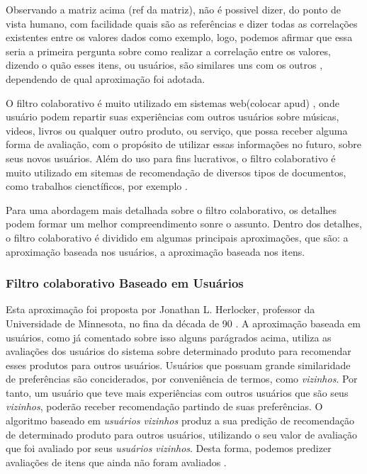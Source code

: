 \documentclass[12pt,
				openright,
				twoside,
				a4paper,
				apter=TITLE,
				section=TITLE,
				subsection=TITLE,
				chapter=TITLE,
				english,
				french,
				spanish,
				brazil]{abntex2}
\begin{document}
Observando a matriz acima (ref da matriz), não é possivel dizer, do ponto de vista humano, com facilidade quais são as referências e dizer todas as correlações existentes entre os valores dados como exemplo, logo, podemos afirmar que essa seria a primeira pergunta sobre como realizar a correlação entre os valores, dizendo o quão esses itens, ou usuários, são similares uns com os outros \cite{ricci2011introduction}, dependendo de qual aproximação foi adotada.

O filtro colaborativo é muito utilizado em sistemas web(colocar apud) \cite{turban2009electronic}, onde usuário podem repartir suas experiências com outros usuários sobre músicas, videos, livros ou qualquer outro produto, ou serviço, que possa receber alguma forma de avaliação, com o propósito de utilizar essas informações no futuro, sobre seus novos usuários. Além do uso para fins lucrativos, o filtro colaborativo é muito utilizado em sitemas de recomendação de diversos tipos de documentos, como trabalhos cienctíficos, por exemplo \cite{sun2010new}. 

Para uma abordagem mais detalhada sobre o filtro colaborativo, os detalhes podem formar um melhor compreendimento sonre o assunto. Dentro dos detalhes, o filtro colaborativo é dividido em algumas principais aproximações, que são: a aproximação baseada nos usuários, a aproximação baseada nos itens. %


\subsubsection{Filtro colaborativo Baseado em Usuários}
Esta aproximação foi proposta por Jonathan L. Herlocker, professor da Universidade de Minnesota, no fina da década de 90 \cite{sun2010new}. A aproximação baseada em usuários, como já comentado sobre isso alguns parágrados acima, utiliza as avaliações dos usuários do sistema sobre determinado produto para recomendar esses produtos para outros usuários. Usuários que possuam grande similaridade de preferências são conciderados, por conveniência de termos, como \textit{vizinhos}. Por tanto, um usuário que teve mais experiências com outros usuários que são seus \textit{vizinhos}, poderão receber recomendação partindo de suas preferências. O algoritmo baseado em \textit{usuários vizinhos} produz a sua predição de recomendação de determinado produto para outros usuários, utilizando o seu valor de avaliação que foi avaliado por seus \textit{usuários vizinhos}. Desta forma, podemos predizer avaliações de itens que ainda não foram avaliados \cite{zhao2010user}\cite{wang2006unifying}. 
\end{document}
